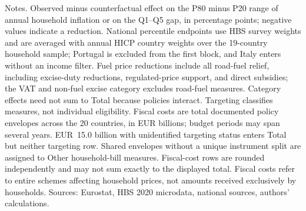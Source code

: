 \begin{table}[H]
\begin{flushleft}
\footnotesize{Notes. Observed minus counterfactual effect on the P80 minus P20 range of annual household inflation or on the Q1--Q5 gap, in percentage points; negative values indicate a reduction. National percentile endpoints use HBS survey weights and are averaged with annual HICP country weights over the 19-country household sample; Portugal is excluded from the first block, and Italy enters without an income filter. Fuel price reductions include all road-fuel relief, including excise-duty reductions, regulated-price support, and direct subsidies; the VAT and non-fuel excise category excludes road-fuel measures. Category effects need not sum to Total because policies interact. Targeting classifies measures, not individual eligibility. Fiscal costs are total documented policy envelopes across the 20 countries, in EUR billions; budget periods may span several years. EUR~15.0 billion with unidentified targeting status enters Total but neither targeting row. Shared envelopes without a unique instrument split are assigned to Other household-bill measures. Fiscal-cost rows are rounded independently and may not sum exactly to the displayed total. Fiscal costs refer to entire schemes affecting household prices, not amounts received exclusively by households. Sources: Eurostat, HBS 2020 microdata, national sources, authors' calculations.}
\end{flushleft}
\end{table}
